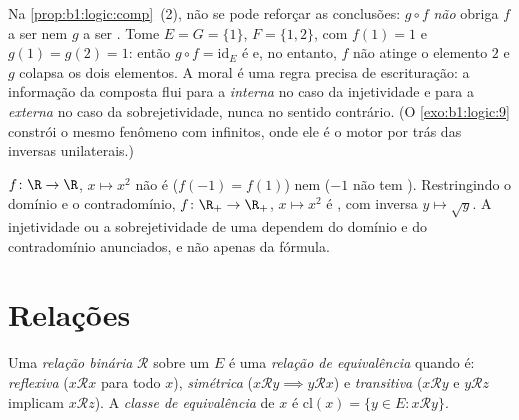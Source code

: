 \begin{example}\label{ex:b1:logic:compsharp}
Na \cref{prop:b1:logic:comp}~(2), não se pode reforçar as conclusões:
$g \circ f$  \emph{não} obriga $f$ a ser  nem $g$
a ser . Tome $E = G = \{1\}$, $F = \{1,
2\}$, com $f(1) = 1$ e $g(1) = g(2) = 1$: então $g \circ f =
\mathrm{id}_E$ é  e, no entanto, $f$ não atinge o elemento $2$ e
$g$ colapsa os dois elementos. A moral é uma regra precisa de
escrituração: a informação da composta flui para a 
\emph{interna} no caso da injetividade e para a  \emph{externa}
no caso da sobrejetividade, nunca no sentido contrário. (O \cref{exo:b1:logic:9}
constrói o mesmo fenômeno com  infinitos, onde ele é o motor
por trás das inversas unilaterais.)
\end{example}

\begin{example}\label{ex:b1:logic:injexamples}
$f \colon \R \to \R$, $x \mapsto x^2$ não é  ($f(-1) =
f(1)$) nem  ($-1$ não tem ). Restringindo o domínio
e o contradomínio, $f \colon \R_+ \to \R_+$, $x \mapsto x^2$ é ,
com inversa $y \mapsto \sqrt y$. A injetividade ou a sobrejetividade de uma 
dependem do domínio e do contradomínio anunciados, e não apenas da
fórmula.
\end{example}

\section{Relações}

\begin{definition}\label{def:b1:logic:equiv}
Uma \emph{relação binária} $\mathcal{R}$ sobre um  $E$ é uma
\emph{relação de equivalência} quando é:
\emph{reflexiva} ($x \mathbin{\mathcal{R}} x$ para todo $x$),
\emph{simétrica} ($x \mathbin{\mathcal{R}} y \implies y
\mathbin{\mathcal{R}} x$) e \emph{transitiva} ($x
\mathbin{\mathcal{R}} y$ e $y \mathbin{\mathcal{R}} z$ implicam $x
\mathbin{\mathcal{R}} z$). A \emph{classe de equivalência} de $x$ é
$\mathrm{cl}(x) = \{y \in E : x \mathbin{\mathcal{R}} y\}$.
\end{definition}

